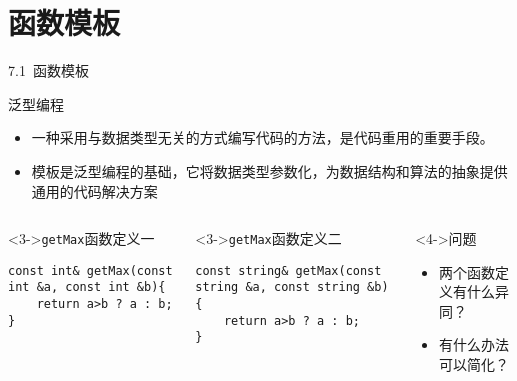 
\section{函数模板}




\begin{frame}[fragile]{7.1~函数模板}

\begin{block}{泛型编程}
\begin{itemize}
  \item 一种采用与数据类型无关的方式编写代码的方法，是\alert{代码重用}的重要手段。
  \item <3->\alert{模板}是泛型编程的基础，它将数据类型参数化，为数据结构和算法的\alert{抽象}提供\alert{通用的代码}解决方案
\end{itemize}

\end{block}

\vspace{1mm}


\vspace{-4mm}

\begin{columns}[t]

\begin{blueblock}<3->{\texttt{getMax}函数定义一}
\vspace{-1.5mm}\begin{lstlisting}
const int& getMax(const int &a, const int &b){
    return a>b ? a : b;
}
\end{lstlisting}\vspace{-1.5mm}
\end{blueblock}
\begin{blueblock}<3->{\texttt{getMax}函数定义二}
\vspace{-1.5mm}\begin{lstlisting}
const string& getMax(const string &a, const string &b){
    return a>b ? a : b;
}
\end{lstlisting}\vspace{-1.5mm}
\end{blueblock}

\begin{greenblock}<4->{问题}
\begin{itemize}
  \item 两个函数定义有什么异同？
  \item <5-> 有什么办法可以简化？
\end{itemize}

\end{greenblock}

\end{columns}

\end{frame}

